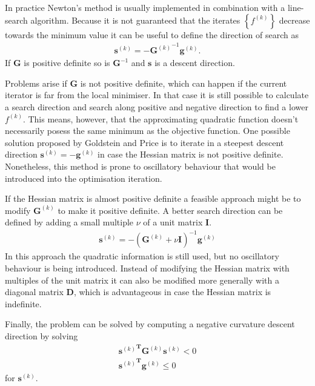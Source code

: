 In practice Newton's method is usually implemented in combination with a
line-search algorithm. Because it is not guaranteed that the iterates
$\left\{f^{(k)}\right\}$ decrease towards the minimum value it can be useful to
define the direction of search as
%
\begin{align}
    \mathbf{s}^{(k)}=-{\mathbf{G}^{(k)}}^{-1}\mathbf{g}^{(k)}.
\end{align}
%
If $\mathbf{G}$ is positive definite so is $\mathbf{G}^{-1}$ and $\mathbf{s}$ is
a descent direction.

Problems arise if $\mathbf{G}$ is not positive definite, which can happen if
the current iterator is far from the local minimiser. In that case it is still
possible to calculate a search direction and search along positive and negative
direction to find a lower $f^{(k)}$. This means, however, that the
approximating quadratic function doesn't necessarily posess the same minimum
as the objective function. One possible solution proposed by Goldstein and
Price\autocite{Goldstein_effectivealgorithmminimization_1967} is to iterate in
a steepest descent direction $\mathbf{s}^{(k)}=-\mathbf{g}^{(k)}$ in case the
Hessian matrix is not positive definite. Nonetheless, this method is prone to
oscillatory behaviour that would be introduced into the optimisation iteration.

If the Hessian matrix is almost positive definite a feasible approach might be
to modify $\mathbf{G}^{(k)}$ to make it positive definite. A better search
direction can be defined by adding a small multiple $\nu$ of a unit matrix
$\mathbf{I}$.
\autocite{Levenberg_methodsolutioncertain_1944,Marquardt_AlgorithmLeastSquaresEstimation_1963,Goldfeld_MaximizationQuadraticHillClimbing_1966}
%
\begin{align}
\mathbf{s}^{(k)}=-\left(\mathbf{G}^{(k)}+\nu\mathbf{I}\right)^{-1}\mathbf{g}^{(k)}
\end{align}
%
In this approach the quadratic information is still used, but no oscillatory
behaviour is being introduced. Instead of modifying the Hessian matrix with
multiples of the unit matrix it can also be modified more generally with a
diagonal matrix $\mathbf{D}$, which is advantageous in case the Hessian matrix
is indefinite.
\autocite{Murray_Secondderivativemethods_1972,Hebden_algorithmminimizationusing_1973}

Finally, the problem can be solved by computing a negative curvature descent
direction by solving
%
\begin{align}
    {\mathbf{s}^{(k)}}^\mathbf{T}\mathbf{G}^{(k)}\mathbf{s}^{(k)}<0\\
    {\mathbf{s}^{(k)}}^\mathbf{T}\mathbf{g}^{(k)}\leq0
\end{align}
for $\mathbf{s}^{(k)}$.\autocite{Fiacco_NonlinearProgramming_1990}


